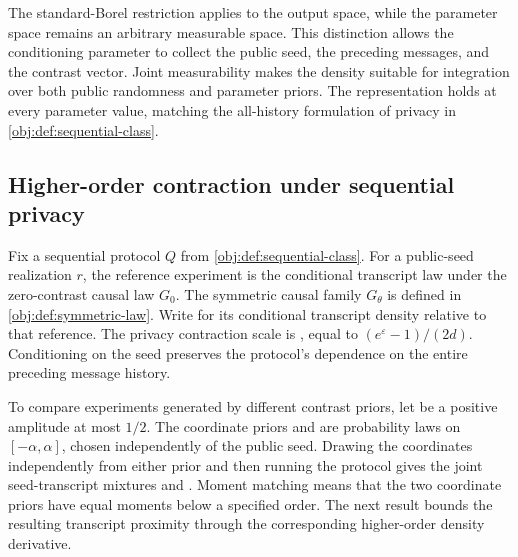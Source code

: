 The standard-Borel restriction applies to the output space, while the parameter space remains an arbitrary measurable space. This distinction allows the conditioning parameter to collect the public seed, the preceding messages, and the contrast vector. Joint measurability makes the density suitable for integration over both public randomness and parameter priors. The representation holds at every parameter value, matching the all-history formulation of privacy in \cref{obj:def:sequential-class}.

\subsection{Higher-order contraction under sequential privacy}

Fix a sequential protocol \(Q\) from \cref{obj:def:sequential-class}. For a public-seed realization \(r\), the reference experiment is the conditional transcript law under the zero-contrast causal law \(G_0\). The symmetric causal family \(G_\theta\) is defined in \cref{obj:def:symmetric-law}. Write  for its conditional transcript density relative to that reference. The privacy contraction scale is , equal to \((e^\varepsilon-1)/(2d)\). Conditioning on the seed preserves the protocol's dependence on the entire preceding message history.

To compare experiments generated by different contrast priors, let  be a positive amplitude at most \(1/2\). The coordinate priors  and  are probability laws on \([-\alpha,\alpha]\), chosen independently of the public seed. Drawing the coordinates independently from either prior and then running the protocol gives the joint seed-transcript mixtures  and . Moment matching means that the two coordinate priors have equal moments below a specified order. The next result bounds the resulting transcript proximity through the corresponding higher-order density derivative.

